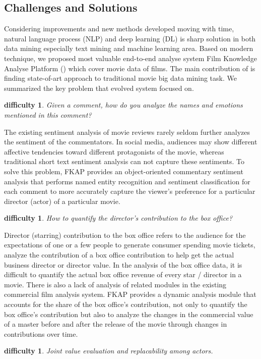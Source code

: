 \subsection{Challenges and Solutions}
Considering improvements and new methods developed moving with time, natural language process (NLP) and deep learning (DL) is sharp solution in both data mining especially text mining and machine learning area. Based on modern technique, we proposed most valuable end-to-end analyse system Film Knowledge Analyse Platform (\system) which cover movie data of films. The main contribution of \system is finding state-of-art approach to traditional movie big data mining task. We summarized the key problem that evolved system \system focused on.
\newtheorem{difficulties}[theorem]{difficulty}
\begin{difficulties}
Given a comment, how do you analyze the names and emotions mentioned in this comment? \end{difficulties} 
\par The existing sentiment analysis of movie reviews rarely seldom further analyzes the sentiment of the commentators. In social media, audiences may show different affective tendencies toward different protagonists of the movie, whereas traditional short text sentiment analysis can not capture these sentiments. To solve this problem, FKAP provides an object-oriented commentary sentiment analysis that performs named entity recognition and sentiment classification for each comment to more accurately capture the viewer's preference for a particular director (actor) of a particular movie.
\begin{difficulties}
How to quantify the director's contribution to the box office?
\end{difficulties} 
\par Director (starring) contribution to the box office refers to the audience for the expectations of one or a few people to generate consumer spending movie tickets, analyze the contribution of a box office contribution to help get the actual business director or director value. In the analysis of the box office data, it is difficult to quantify the actual box office revenue of every star / director in a movie. There is also a lack of analysis of related modules in the existing commercial film analysis system.
FKAP provides a dynamic analysis module that accounts for the share of the box office's contribution, not only to quantify the box office's contribution but also to analyze the changes in the commercial value of a master before and after the release of the movie through changes in contributions over time.
\begin{difficulties} Joint value evaluation and replacability among actors.\end{difficulties}
